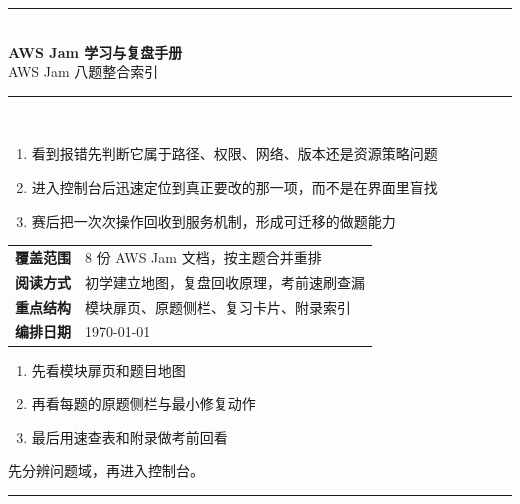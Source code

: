 \documentclass[12pt,a4paper]{article}
\begin{document}
\begin{titlepage}
  \centering
  \vspace*{1.55cm}
  {\color{terracotta}\rule{0.9\linewidth}{1.8pt}}\\[0.55cm]
  {\sffamily\bfseries\fontsize{26}{32}\selectfont\color{ink} AWS Jam 学习与复盘手册}\\[0.25cm]
  {\sffamily\Large\color{terracotta} AWS Jam 八题整合索引}\\[0.7cm]
  {\color{paperline}\rule{0.9\linewidth}{0.8pt}}\\[0.95cm]

  \begin{guidebox}[width=0.9\linewidth,title={使用目标}]
    \begin{enumerate}
      \item 看到报错先判断它属于路径、权限、网络、版本还是资源策略问题
      \item 进入控制台后迅速定位到真正要改的那一项，而不是在界面里盲找
      \item 赛后把一次次操作回收到服务机制，形成可迁移的做题能力
    \end{enumerate}
  \end{guidebox}

  \vspace{0.2cm}
  \begin{tabularx}{0.9\linewidth}{L{2.8cm}Y}
    \textbf{覆盖范围} & 8 份 AWS Jam 文档，按主题合并重排 \\[0.25em]
    \textbf{阅读方式} & 初学建立地图，复盘回收原理，考前速刷查漏 \\[0.25em]
    \textbf{重点结构} & 模块扉页、原题侧栏、复习卡片、附录索引 \\[0.25em]
    \textbf{编排日期} & \today \\
  \end{tabularx}

  \vfill
  \begin{guidebox}[width=0.82\linewidth,title={阅读顺序}]
    \begin{enumerate}
      \item 先看模块扉页和题目地图
      \item 再看每题的原题侧栏与最小修复动作
      \item 最后用速查表和附录做考前回看
    \end{enumerate}
  \end{guidebox}

  \vfill
  {\color{clay}\sffamily\large 先分辨问题域，再进入控制台。}\\[0.35cm]
  {\color{paperline}\rule{0.42\linewidth}{1.2pt}}
\end{titlepage}
\end{document}
